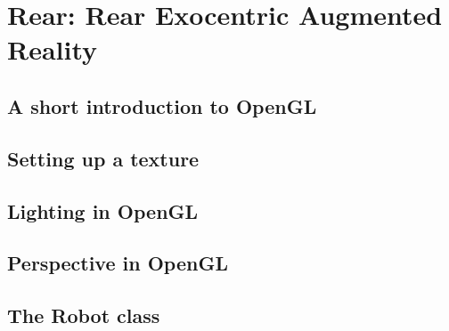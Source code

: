 \section{Rear: Rear Exocentric Augmented Reality}
\label{sec:rear}

\subsection{A short introduction to OpenGL}
\subsection{Setting up a texture}
\subsection{Lighting in OpenGL}
\subsection{Perspective in OpenGL}
\subsection{The Robot class}

